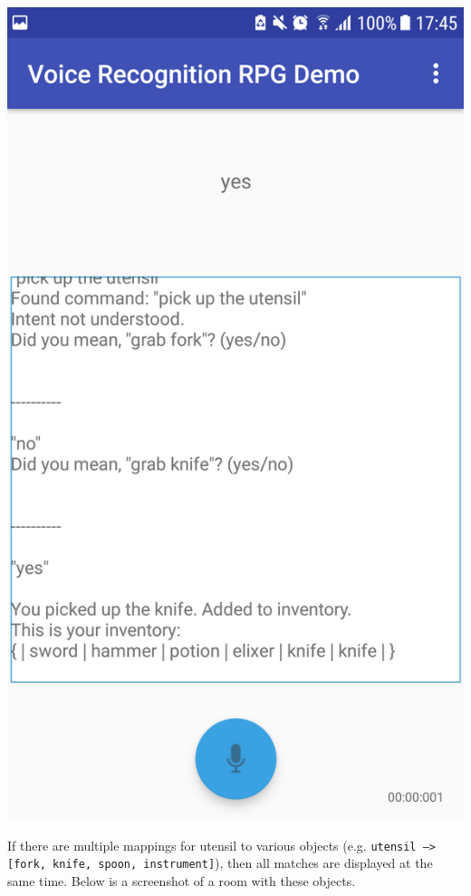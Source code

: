 \documentclass[11pt]{article}
\begin{document}
\begin{appendices}
\begin{center}
\includegraphics[scale=0.18]{utensil-2.png}
\end{center}

\newpage
If there are multiple mappings for utensil to various objects (e.g. \texttt{utensil --> [fork, knife, spoon, instrument]}), then all matches are displayed at the same time. Below is a screenshot of a room with these objects.


\end{appendices}
\end{document}
